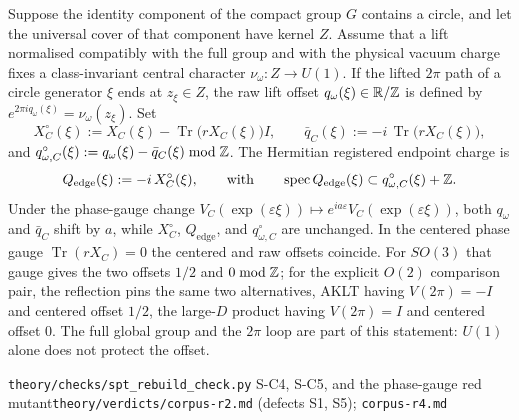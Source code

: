 \begin{definition}
\smallskip
Suppose the identity component of the compact group $G$ contains a circle, and
let the universal cover of that component have kernel $Z$. Assume that a lift
normalised compatibly with the full group and with the physical vacuum charge
fixes a class-invariant central character $\nu_\omega:Z\to U(1)$. If the
lifted $2\pi$ path of a circle generator $\xi$ ends at $z_\xi\in Z$, the raw
lift offset $q_\omega(\xi)\in\mathbb{R}/\mathbb{Z}$ is defined by
$e^{2\pi i q_\omega(\xi)}=\nu_\omega(z_\xi)$. Set
\begin{equation}
  X^{\circ}_C(\xi):=X_C(\xi)-\operatorname{Tr}\bigl(rX_C(\xi)\bigr)I,
  \qquad
  \bar q_C(\xi):=-i\,\operatorname{Tr}\bigl(rX_C(\xi)\bigr),
  \label{eq:spt-centering}
\end{equation}
and $q^{\circ}_{\omega,C}(\xi):=q_\omega(\xi)-\bar q_C(\xi)\bmod\mathbb{Z}$. The
Hermitian registered endpoint charge is
\begin{equation}
  Q_{\mathrm{edge}}(\xi):=-i\,X^{\circ}_C(\xi),
  \qquad\text{with}\qquad
  \operatorname{spec} Q_{\mathrm{edge}}(\xi)\subset q^{\circ}_{\omega,C}(\xi)+\mathbb{Z} .
  \label{eq:spt-shifted-lattice}
\end{equation}
Under the phase-gauge change $V_C(\exp(\varepsilon\xi))\mapsto
e^{ia\varepsilon}V_C(\exp(\varepsilon\xi))$, both $q_\omega$ and $\bar q_C$
shift by $a$, while $X^{\circ}_C$, $Q_{\mathrm{edge}}$, and
$q^{\circ}_{\omega,C}$ are unchanged. In the centered phase gauge
$\operatorname{Tr}(rX_C)=0$ the centered and raw offsets coincide. For $SO(3)$ that gauge
gives the two offsets $1/2$ and $0\bmod\mathbb{Z}$; for the explicit $O(2)$ comparison
pair, the reflection pins the same two alternatives, AKLT having $V(2\pi)=-I$
and centered offset $1/2$, the large-$D$ product having $V(2\pi)=I$ and
centered offset $0$. The full global group and the $2\pi$ loop are part of
this statement: $U(1)$ alone does not protect the offset.
\end{definition}

%
{\texttt{theory/checks/spt\_rebuild\_check.py} S-C4, S-C5, and the
phase-gauge red mutant}{\texttt{theory/verdicts/corpus-r2.md} (defects S1,
S5); \texttt{corpus-r4.md}}

